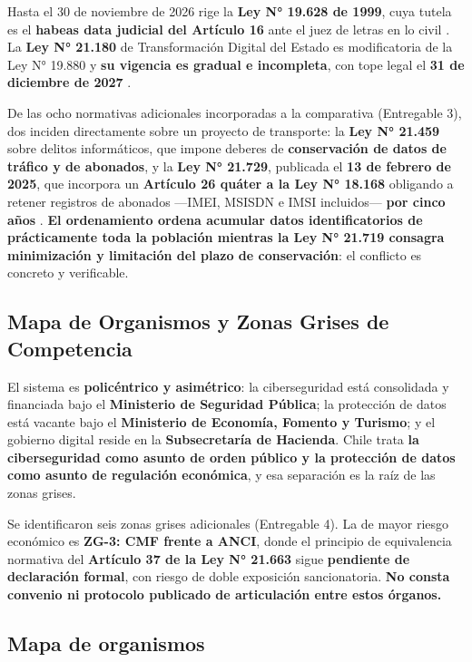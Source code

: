 Hasta el 30 de noviembre de 2026 rige la \textbf{Ley N° 19.628 de 1999}, cuya tutela es el \textbf{habeas data judicial del Artículo 16} ante el juez de letras en lo civil . La \textbf{Ley N° 21.180} de Transformación Digital del Estado es modificatoria de la Ley N° 19.880 y \textbf{su vigencia es gradual e incompleta}, con tope legal el \textbf{31 de diciembre de 2027} .

De las ocho normativas adicionales incorporadas a la comparativa (Entregable 3), dos inciden directamente sobre un proyecto de transporte: la \textbf{Ley N° 21.459} sobre delitos informáticos, que impone deberes de \textbf{conservación de datos de tráfico y de abonados}, y la \textbf{Ley N° 21.729}, publicada el \textbf{13 de febrero de 2025}, que incorpora un \textbf{Artículo 26 quáter a la Ley N° 18.168} obligando a retener registros de abonados ---IMEI, MSISDN e IMSI incluidos--- \textbf{por cinco años} . \textbf{El ordenamiento ordena acumular datos identificatorios de prácticamente toda la población mientras la Ley N° 21.719 consagra minimización y limitación del plazo de conservación}: el conflicto es concreto y verificable.

\subsection{Mapa de Organismos y Zonas Grises de Competencia}\label{mapa-de-organismos-y-zonas-grises-de-competencia}

El sistema es \textbf{policéntrico y asimétrico}: la ciberseguridad está consolidada y financiada bajo el \textbf{Ministerio de Seguridad Pública}; la protección de datos está vacante bajo el \textbf{Ministerio de Economía, Fomento y Turismo}; y el gobierno digital reside en la \textbf{Subsecretaría de Hacienda}. Chile trata \textbf{la ciberseguridad como asunto de orden público y la protección de datos como asunto de regulación económica}, y esa separación es la raíz de las zonas grises.

Se identificaron seis zonas grises adicionales (Entregable 4). La de mayor riesgo económico es \textbf{ZG-3: CMF frente a ANCI}, donde el principio de equivalencia normativa del \textbf{Artículo 37 de la Ley N° 21.663} sigue \textbf{pendiente de declaración formal}, con riesgo de doble exposición sancionatoria. \textbf{No consta convenio ni protocolo publicado de articulación entre estos órganos.}

\subsection{Mapa de organismos}\label{mapa-de-organismos}

